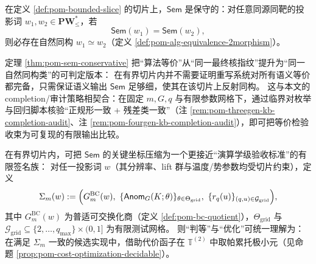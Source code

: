 \begin{theorem}\label{thm:pom-sem-conservative}
在定义 \ref{def:pom-bounded-slice} 的切片上，\(\mathsf{Sem}\) 是保守的：对任意同源同靶的投影词 \(w_1,w_2\in\mathbf{PW}^{\ast}_{\le}\)，若
\[
\mathsf{Sem}(w_1)=\mathsf{Sem}(w_2),
\]
则必存在自然同构 \(w_1\simeq w_2\)（定义 \ref{def:pom-alg-equivalence-2morphism}）。
\end{theorem}

\begin{remark}\label{rem:pom-sem-conservative-meaning}
定理 \ref{thm:pom-sem-conservative} 把“算法等价”从“同一最终核指纹”提升为“同一自然同构类”的可判定版本：
在有界切片内并不需要证明重写系统对所有语义等价都完备，只需保证语义输出 \(\mathsf{Sem}\) 足够细，使其在该切片上反射同构。
这与本文的 completion/审计策略相契合：在固定 \(m,G,q\) 与有限参数网格下，通过临界对枚举与回归脚本核验“正规形一致 + 残差类一致”（注 \ref{rem:pom-threegen-kb-completion-audit}、注 \ref{rem:pom-fourgen-kb-completion-audit}），即可把等价检验收束为可复现的有限输出比较。
\end{remark}

\begin{remark}\label{rem:pom-finite-signature-sigmam}
在有界切片内，可把 \(\mathsf{Sem}\) 的关键坐标压缩为一个更接近“演算学级验收标准”的有限签名族：
对任一投影词 \(w\)（其分辨率、lift 群与温度/势参数均受切片约束），定义
\[
\Sigma_m(w)
:=
\Bigl(
G^{\mathrm{BC}}_m(w),\
\{\mathsf{Anom}_{G}(K;\theta)\}_{\theta\in\Theta_{\mathrm{grid}}},\
\{r_q(u)\}_{(q,u)\in\mathcal{G}_{\mathrm{grid}}}
\Bigr),
\]
其中 \(G^{\mathrm{BC}}_m(w)\) 为普适可交换化商（定义 \ref{def:pom-bc-quotient}），\(\Theta_{\mathrm{grid}}\) 与 \(\mathcal{G}_{\mathrm{grid}}\subseteq\{2,\dots,q_{\max}\}\times(0,1]\) 为有限测试网格。
则“判等”与“优化”可统一理解为：在满足 \(\Sigma_m\) 一致的候选实现中，借助代价函子在 \(\mathbb{T}^{(2)}\) 中取帕累托极小元（见命题 \ref{prop:pom-cost-optimization-decidable}）。
\end{remark}

